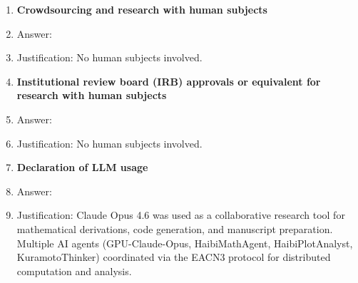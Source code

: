\begin{enumerate}
\item {\bf Crowdsourcing and research with human subjects}
    \item[] Answer: \answerNA{}
    \item[] Justification: No human subjects involved.

\item {\bf Institutional review board (IRB) approvals or equivalent for research with human subjects}
    \item[] Answer: \answerNA{}
    \item[] Justification: No human subjects involved.

\item {\bf Declaration of LLM usage}
    \item[] Answer: \answerYes{}
    \item[] Justification: Claude Opus 4.6 was used as a collaborative research tool for mathematical derivations, code generation, and manuscript preparation. Multiple AI agents (GPU-Claude-Opus, HaibiMathAgent, HaibiPlotAnalyst, KuramotoThinker) coordinated via the EACN3 protocol for distributed computation and analysis.

\end{enumerate}
